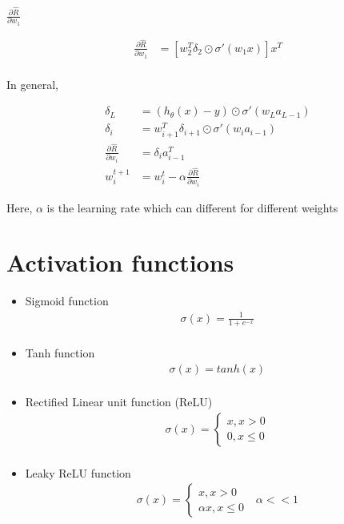 \documentclass[11pt]{article}
\begin{document}
$\frac{\partial \hat{R}}{\partial w_1}$

\begin{align*}
  \frac{\partial \hat{R}}{\partial w_1} &= \left[ w_2^T\delta_2 \odot \sigma'(w_1x) \right]x^T \\
\end{align*}

In general, 

\begin{align*}
  \delta_L &= (h_{\theta}(x) - y) \odot \sigma' (w_L a_{L-1}) \\
  \delta_i &= w_{i+1}^T \delta_{i+1} \odot \sigma' (w_ia_{i-1}) \\
  \frac{\partial \hat{R}}{\partial w_i} &= \delta_i a_{i-1}^T \\
  w_i^{t+1} &= w_i^t - \alpha \frac{\partial \hat{R}}{\partial w_i}
\end{align*}

Here, $\alpha$ is the learning rate which can different for different weights

\section{Activation functions}
\label{sec:activation-functions}

\begin{itemize}
\item Sigmoid function
\begin{align*}
  \sigma(x) = \frac{1}{1 + e^{-x}} \\
\end{align*}
\item Tanh function
\begin{align*}
  \sigma(x) = tanh(x) \\
\end{align*}
\item Rectified Linear unit function (ReLU)
\begin{align*}
  \sigma(x) = \begin{cases} x, x > 0 \\ 0, x \leq 0\end{cases} \\
\end{align*}
\item Leaky ReLU function
\begin{align*}
  \sigma(x) = \begin{cases} x, x > 0 \\ \alpha x, x \leq 0\end{cases}
  \text{   $\alpha << 1$}\\
\end{align*}
\end{itemize}
\end{document}

